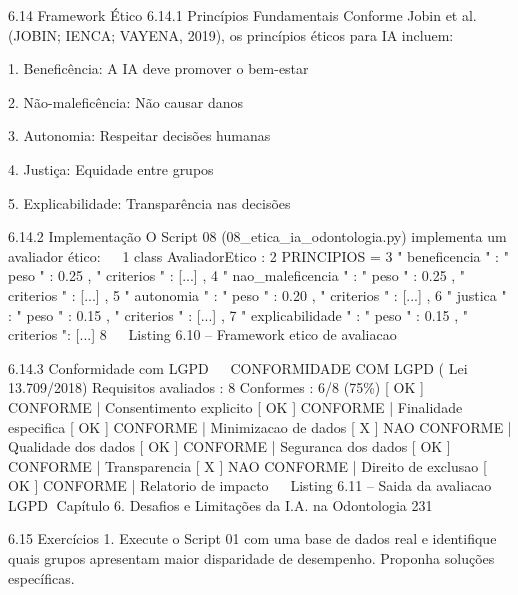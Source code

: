      6.14       Framework Ético
     6.14.1     Princípios Fundamentais
     Conforme Jobin et al. (JOBIN; IENCA; VAYENA, 2019), os princípios éticos para IA
     incluem:

         1. Beneficência: A IA deve promover o bem-estar

         2. Não-maleficência: Não causar danos

         3. Autonomia: Respeitar decisões humanas

         4. Justiça: Equidade entre grupos

         5. Explicabilidade: Transparência nas decisões

     6.14.2     Implementação
     O Script 08 (08_etica_ia_odontologia.py) implementa um avaliador ético:
                                                                                                  
 1 class AvaliadorEtico :
 2     PRINCIPIOS = {
 3         " beneficencia " : { " peso " : 0.25 , " criterios " : [...]} ,
 4         " nao_maleficencia " : { " peso " : 0.25 , " criterios " : [...]} ,
 5         " autonomia " : { " peso " : 0.20 , " criterios " : [...]} ,
 6         " justica " : { " peso " : 0.15 , " criterios " : [...]} ,
 7         " explicabilidade " : { " peso " : 0.15 , " criterios ": [...]}
 8     }
                                                                                                  
                             Listing 6.10 – Framework etico de avaliacao


     6.14.3     Conformidade com LGPD
                                                                                                  
     CONFORMIDADE COM LGPD ( Lei 13.709/2018)
     Requisitos avaliados : 8
     Conformes : 6/8 (75\%)
       [ OK ] CONFORME | Consentimento explicito
       [ OK ] CONFORME | Finalidade especifica
       [ OK ] CONFORME | Minimizacao de dados
       [ X ] NAO CONFORME | Qualidade dos dados
       [ OK ] CONFORME | Seguranca dos dados
       [ OK ] CONFORME | Transparencia
       [ X ] NAO CONFORME | Direito de exclusao
       [ OK ] CONFORME | Relatorio de impacto
                                                                                                  
                               Listing 6.11 – Saida da avaliacao LGPD
Capítulo 6. Desafios e Limitações da I.A. na Odontologia                      231


6.15       Exercícios
  1. Execute o Script 01 com uma base de dados real e identifique quais grupos
     apresentam maior disparidade de desempenho. Proponha soluções específicas.

